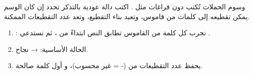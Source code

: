 \begin{statement}
وسوم الحملات تُكتب دون فراغات مثل . اكتب دالة عودية بالتذكر  تحدد إن كان الوسم يمكن تقطيعه إلى كلمات من قاموس، وتعيد بناء التقطيع، وتعد عدد التقطيعات الممكنة.
\end{statement}
\begin{stepsbox}\begin{enumerate}
\item {}: نجرب كل كلمة من القاموس تطابق النص ابتداءً من ، ثم نستدعي .
\item الحالة الأساسية:  → نجاح.
\item {} يحفظ عدد التقطيعات من  (- = غير محسوب)، و  أول كلمة صالحة.
\end{enumerate}\end{stepsbox}
